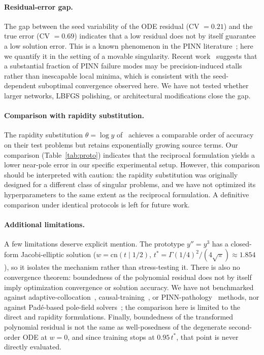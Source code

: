 \documentclass[a4paper, 10pt]{article}
\theoremstyle{definition}
\begin{document}
\paragraph{Residual-error gap.}
The gap between the seed variability of the ODE residual (CV $= 0.21$) and the true error (CV $= 0.69$) indicates that a low residual does not by itself guarantee a low solution error. This is a known phenomenon in the PINN literature~\cite{Krishnapriyan2021,FP64NeurIPS2025}; here we quantify it in the setting of a movable singularity. Recent work~\cite{FP64NeurIPS2025} suggests that a substantial fraction of PINN failure modes may be precision-induced stalls rather than inescapable local minima, which is consistent with the seed-dependent suboptimal convergence observed here. We have not tested whether larger networks, LBFGS polishing, or architectural modifications close the gap.

\paragraph{Comparison with rapidity substitution.}
The rapidity substitution $\theta = \log y$ of~\citet{Cayuso2025} achieves a comparable order of accuracy on their test problems but retains exponentially growing source terms. Our comparison (Table~\ref{tab:proto}) indicates that the reciprocal formulation yields a lower near-pole error in our specific experimental setup. However, this comparison should be interpreted with caution: the rapidity substitution was originally designed for a different class of singular problems, and we have not optimized its hyperparameters to the same extent as the reciprocal formulation. A definitive comparison under identical protocols is left for future work.

\paragraph{Additional limitations.} A few limitations deserve explicit mention. The prototype $y''=y^3$ has a closed-form Jacobi-elliptic solution ($w = \mathrm{cn}(t \mid 1/2)$, $t^* = \Gamma(1/4)^2/(4\sqrt{\pi}) \approx 1.854$), so it isolates the mechanism rather than stress-testing it. There is also no convergence theorem: boundedness of the polynomial residual does not by itself imply optimization convergence or solution accuracy. We have not benchmarked against adaptive-collocation~\cite{Wu2023Adaptive,ARGUS2026}, causal-training~\cite{Wang2024Causal,GaussianCausal2026}, or PINN-pathology~\cite{Krishnapriyan2021,FP64NeurIPS2025} methods, nor against Pad\'e-based pole-field solvers~\cite{Fornberg2011}; the comparison here is limited to the direct and rapidity formulations. Finally, boundedness of the transformed polynomial residual is not the same as well-posedness of the degenerate second-order ODE at $w=0$, and since training stops at $0.95\,t^*$, that point is never directly evaluated.
\end{document}
